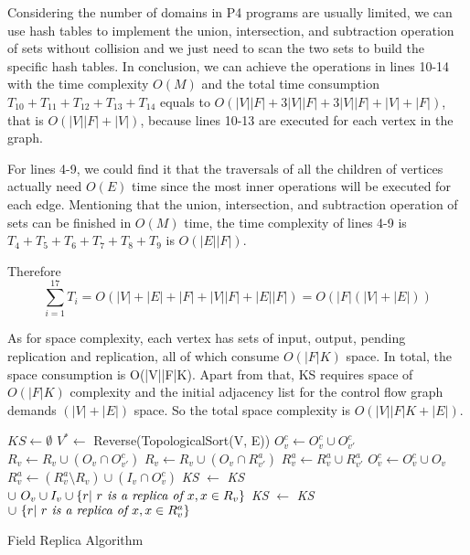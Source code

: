 \documentclass[sigconf]{acmart}
\begin{document}
Considering the number of domains in P4 programs are usually limited, we can use hash tables to implement the union, intersection, and subtraction operation of sets without collision and we just need to scan the two sets to build the specific hash tables. In conclusion, we can achieve the operations in lines 10-14 with the time complexity $O(M)$ and the total time consumption $T_{10} + T_{11} + T_{12} + T_{13} + T_{14}$ equals to $O( |V||F| + 3|V||F| + 3|V||F| + |V|+|F|)$, that is $O(|V||F| + |V|)$, because lines 10-13 are executed for each vertex in the graph.


For lines 4-9, we could find it that the traversals of all the children of vertices actually need $O(E)$ time since the most inner operations will be executed for each edge. Mentioning that the union, intersection, and subtraction operation of sets can be finished in $O(M)$ time, the time complexity of lines 4-9 is $T_{4} + T_{5} + T_{6} + T_{7} + T_{8} + T_{9}$ is $O(|E||F|)$.

Therefore 
\begin{displaymath}
\sum_{i=1}^{17}T_{i}= O(|V|+|E|+|F|+|V||F|+|E||F|) =O(|F|(|V|+|E|))
\end{displaymath}


As for space complexity, each vertex has sets of input, output, pending replication and replication, all of which consume $O(|F|K)$ space. In total, the space consumption is O(|V||F|K). Apart from that, KS requires space of $O(|F|K)$ complexity and the initial adjacency list for the control flow graph demands $(|V|+|E|)$ space. So the total space complexity is $O(|V||F|K+|E|)$.

\begin{algorithm}[!t]
\LinesNumbered
{}
$KS \leftarrow \emptyset$ \;
$ V^{*} \leftarrow $ Reverse(TopologicalSort(V, E)) \;
 {
     {
    	$O^c_v \leftarrow O^c_v \cup O^c_{v'}$ \;
    	$ R_v \leftarrow R_v \cup ( O_v \cap O^c_{v'} ) $ \;
    	$ R_v \leftarrow R_v \cup ( O_v \cap R_{v'}^a )$ \;
        $ R^a_v \leftarrow R^a_v \cup R^a_{v'}  $ \;
    }    
	$O^c_v \leftarrow O^c_v \cup O_v $ \;
    $R^a_v \leftarrow (R^a_v \setminus R_v) \cup (I_v \cap O^c_v) $ \;
    \textit{KS} $\leftarrow$ \textit{KS} $ \cup \ O_v \cup I_v \cup \{r|\ \text{\textit{$r$ is a replica of $x$}}, x \in R_v\} $\;
     {
    	\textit{KS} $\leftarrow$ \textit{KS} $ \cup \ \{r|\ \text{\textit{$r$ is a replica of $x$}}, x \in R^a_v\}  $\;
    }
}
\;
\caption{Field Replica Algorithm}
\label{alg:field-replica}
\end{algorithm}
\end{document}
